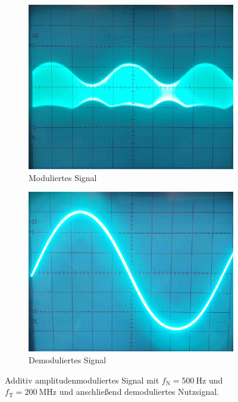 \documentclass[a4paper,twoside,final]{article}
\begin{document}
\begin{figure}[htp]
    \centering
    \begin{subfigure}{0.45\textwidth}
        \includegraphics[width=\textwidth]{Bilder/AM_500Hz_200MHz.jpg}
        \caption{Moduliertes Signal}
    \end{subfigure}\hspace{1cm}
    \begin{subfigure}{0.45\textwidth}
        \includegraphics[width=\textwidth]{Bilder/AM_500Hz_demoduliert.jpg}
        \caption{Demoduliertes Signal}
    \end{subfigure}
    \caption{Additiv amplitudenmoduliertes Signal mit $f_\text{N} = \SI{500}{\hertz}$ und $f_\text{T} = \SI{200}{\mega\hertz}$ und anschließend demoduliertes Nutzsignal.}
    \label{fig:Demodulation}
\end{figure}\\
\end{document}
